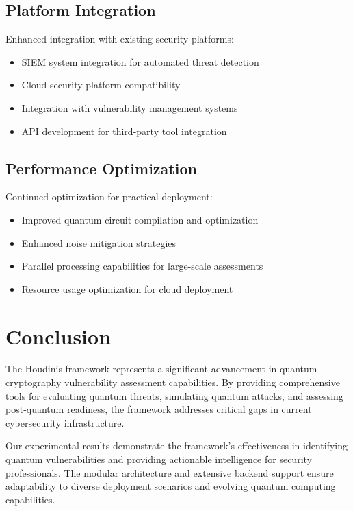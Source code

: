 \documentclass[11pt]{article}
\begin{document}
\subsection{Platform Integration}

Enhanced integration with existing security platforms:

\begin{itemize}
\item SIEM system integration for automated threat detection
\item Cloud security platform compatibility
\item Integration with vulnerability management systems
\item API development for third-party tool integration
\end{itemize}

\subsection{Performance Optimization}

Continued optimization for practical deployment:

\begin{itemize}
\item Improved quantum circuit compilation and optimization
\item Enhanced noise mitigation strategies
\item Parallel processing capabilities for large-scale assessments
\item Resource usage optimization for cloud deployment
\end{itemize}

\section{Conclusion}

The Houdinis framework represents a significant advancement in quantum cryptography vulnerability assessment capabilities. By providing comprehensive tools for evaluating quantum threats, simulating quantum attacks, and assessing post-quantum readiness, the framework addresses critical gaps in current cybersecurity infrastructure.

Our experimental results demonstrate the framework's effectiveness in identifying quantum vulnerabilities and providing actionable intelligence for security professionals. The modular architecture and extensive backend support ensure adaptability to diverse deployment scenarios and evolving quantum computing capabilities.
\end{document}
